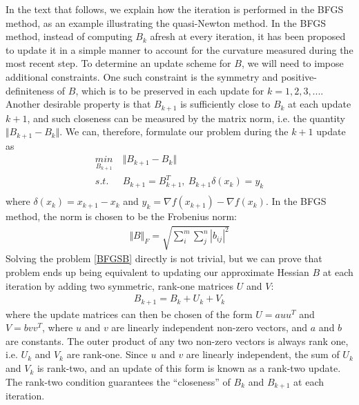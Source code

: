 \documentclass  [
  paper    = a4,
  BCOR     = 10mm,
  twoside,
  fontsize = 12pt,
  fleqn,
  toc      = bibnumbered,
  toc      = listofnumbered,
  numbers  = noendperiod,
  headings = normal,
  listof   = leveldown,
  version  = 3.03
]                                       {scrreprt}
\newcommand{\<}{\langle}
\renewcommand{\>}{\rangle}
\begin{document}
   In the text that follows, we explain how the iteration is performed in the BFGS method, as an example illustrating the quasi-Newton method. In the BFGS method, instead of computing $B_k$ afresh at every iteration, it has been proposed to update it in a simple manner to account for the curvature measured during the most recent step. To determine an update scheme for $B$, we will need to impose additional constraints. One such constraint is the symmetry and positive-definiteness of $B$, which is to be preserved in each update for $k = 1,2, 3, ...$. Another desirable property is that $B_{k+1}$ is sufficiently close to $B_k$ at each update $k+1$, and such closeness can be measured by the matrix norm, i.e. the quantity $\Vert B_{k+1} - B_{k} \Vert$. We can, therefore, formulate our problem during the $k+1$ update as 
   \begin{equation}
   \begin{aligned}
   \underset{B_{k+1}}{min} \  &  \Vert B_{k+1} - B_{k} \Vert\\
   s.t.\ \  & B_{k+1}= B_{k+1}^T, \ B_{k+1}\delta(x_k)  = y_k \\
   \end{aligned}
   \label{BFGSB}
   \end{equation}
   where $\delta(x_k) = x_{k+1} -x_k$ and $y_k = \nabla f(x_{k+1}) - \nabla f(x_k)$. In the BFGS method, the norm is chosen to be the Frobenius norm:
   \begin{align*}
   \Vert B \Vert_F = \sqrt{\sum_{i}^{m} \sum_{j}^{n} |b_{ij}|^2} 
   \end{align*}
   Solving the problem \ref{BFGSB} directly is not trivial, but we can prove that problem ends up being equivalent to updating our approximate Hessian $B$ at each iteration by adding two symmetric, rank-one matrices $U$ and $V$:
   \begin{align*}
   B_{k+1} = B_k + U_k + V_k
   \end{align*}
   where the update matrices can then be chosen of the form $U = a u u^T$ and $V = b v v^T$, where $u$ and $v$ are linearly independent non-zero vectors, and $a$ and $b$ are constants.  The outer product of any two non-zero vectors is always rank one, i.e. $U_k$ and $V_k$ are rank-one. Since $u$ and $v$ are linearly independent, the sum of $U_k$ and $V_k$ is rank-two, and an update of this form is known as a rank-two update. The rank-two condition guarantees the “closeness” of $B_k$ and $B_{k+1}$ at each iteration. 
   
\end{document}
